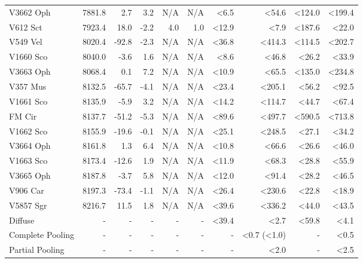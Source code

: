 \documentclass{aa}
\begin{document}
\begin{longtable}{lrrrrrrrrr}
	V3662 Oph &  7881.8 &    2.7 &   3.2 &   N/A &       N/A &   <6.5 &   <54.6 &   <124.0 &  <199.4 \\
	V612 Sct &  7923.4 &   18.0 &  -2.2 &   4.0 &       1.0 &  <12.9 &    <7.9 &   <187.6 &   <22.0 \\
	V549 Vel &  8020.4 &  -92.8 &  -2.3 &   N/A &       N/A &  <36.8 &  <414.3 &   <114.5 &  <202.7 \\
	V1660 Sco &  8040.0 &   -3.6 &   1.6 &   N/A &       N/A &   <8.6 &   <46.8 &    <26.2 &   <33.9 \\
	V3663 Oph &  8068.4 &    0.1 &   7.2 &   N/A &       N/A &  <10.9 &   <65.5 &   <135.0 &  <234.8 \\
	V357 Mus &  8132.5 &  -65.7 &  -4.1 &   N/A &       N/A &  <23.4 &  <205.1 &    <56.2 &   <92.5 \\
	V1661 Sco &  8135.9 &   -5.9 &   3.2 &   N/A &       N/A &  <14.2 &  <114.7 &    <44.7 &   <67.4 \\
	FM Cir &  8137.7 &  -51.2 &  -5.3 &   N/A &       N/A &  <89.6 &  <497.7 &   <590.5 &  <713.8 \\
	V1662 Sco &  8155.9 &  -19.6 &  -0.1 &   N/A &       N/A &  <25.1 &  <248.5 &    <27.1 &   <34.2 \\
	V3664 Oph &  8161.8 &    1.3 &   6.4 &   N/A &       N/A &  <10.8 &   <66.6 &    <26.6 &   <46.0 \\
	V1663 Sco &  8173.4 &  -12.6 &   1.9 &   N/A &       N/A &  <11.9 &   <68.3 &    <28.8 &   <55.9 \\
	V3665 Oph &  8187.8 &   -3.7 &   5.8 &   N/A &       N/A &  <12.0 &   <91.4 &    <28.2 &   <46.5 \\
	V906 Car &  8197.3 &  -73.4 &  -1.1 &   N/A &       N/A &  <26.4 &  <230.6 &    <22.8 &   <18.9 \\
	V5857 Sgr &  8216.7 &   11.5 &   1.8 &   N/A &       N/A &  <39.6 &  <336.2 &    <44.0 &   <43.5 \\
	\hline
	Diffuse & - & - & - & - & - & <39.4 & <2.7 & <59.8 & <4.1 \\
	\hline
	\hline
	Complete Pooling & - & - & - & - & - & - & <0.7 (<1.0) & - & <0.5 \\
	Partial Pooling & - & - & - & - & - & - & <2.0 & - & <2.5 \\
	\hline
	\end{longtable}
\end{document}
